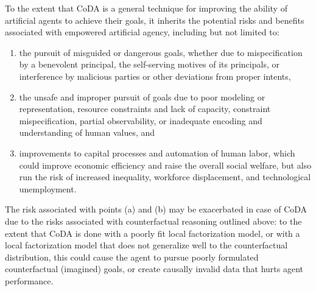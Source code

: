 \documentclass{article}
\begin{document}
To the extent that CoDA is a general technique for improving the ability of artificial agents to achieve their goals, it inherits the potential risks and benefits associated with empowered artificial agency, including but not limited to: 
\begin{enumerate}[label=(\alph*),leftmargin=0.3in,labelsep=0.1in]
\item the pursuit of misguided or dangerous goals, whether due to mispecification by a benevolent principal, the self-serving motives of its principals, or interference by malicious parties or other deviations from proper intents,
\item the unsafe and improper pursuit of goals due to poor modeling or representation, resource constraints and lack of capacity, constraint mispecification, partial observability, or inadequate encoding and understanding of human values, and
\item improvements to capital processes and automation of human labor, which could improve economic efficiency and raise the overall social welfare, but also run the risk of increased inequality, workforce displacement, and technological unemployment. 
\end{enumerate}
The risk associated with points (a) and (b) may be exacerbated in case of CoDA due to the risks associated with counterfactual reasoning outlined above: to the extent that CoDA is done with a poorly fit local factorization model, or with a local factorization model that does not generalize well to the counterfactual distribution, this could cause the agent to pursue poorly formulated counterfactual (imagined) goals, or create causally invalid data that hurts agent performance. 


{\small


}

\newpage



\end{document}
